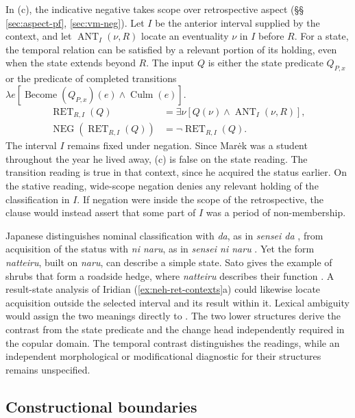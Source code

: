 In (c), the indicative negative takes scope over retrospective aspect
(§§\,\ref{sec:aspect-pf}, \ref{sec:vm-neg}). Let $I$ be the anterior
interval supplied by the context, and let $\operatorname{ANT}_{I}(\nu,R)$
locate an eventuality $\nu$ in $I$ before $R$. For a state, the
temporal relation can be satisfied by a relevant portion of its holding,
even when the state extends beyond $R$. The input $Q$ is either
the state predicate $Q_{P,x}$ or the predicate of completed transitions
$\lambda e[\operatorname{Become}(Q_{P,x})(e)\land\operatorname{Culm}(e)]$.
\[
\begin{aligned}
 \operatorname{RET}_{R,I}(Q)
   &=\exists\nu[Q(\nu)\land\operatorname{ANT}_{I}(\nu,R)],\\
 \operatorname{NEG}(\operatorname{RET}_{R,I}(Q))
   &=\neg\operatorname{RET}_{R,I}(Q).
\end{aligned}
\]
The interval $I$ remains fixed under negation. Since Marėk was a student
throughout the year he lived away, (c) is false on the state reading.
The transition reading is true in that context, since he acquired the
status earlier. On the stative reading, wide-scope negation denies any
relevant holding of the classification in $I$. If negation were
inside the scope of the retrospective, the clause would instead
assert that some part of $I$ was a period of non-membership.

Japanese distinguishes nominal classification with \textit{da},
as in \textit{sensei da} , from acquisition of
the status with \textit{ni naru}, as in \textit{sensei ni naru}
 \cite[455]{martin1988}. Yet the form
\textit{natteiru}, built on \textit{naru}, can describe a simple
state. Sato gives the example of shrubs that form a roadside hedge,
where \textit{natteiru} describes their function
\cite[§4.2, ex.~(23a)]{sato1999}. A result-state analysis of Iridian
(\ref{ex:neh-ret-contexts}a) could likewise locate acquisition outside
the selected interval and its result within it. Lexical ambiguity
would assign the two meanings directly to . The two lower
structures derive the contrast from the state predicate and the change
head independently required in the copular domain. The temporal contrast
distinguishes the readings, while an independent morphological or
modificational diagnostic for their structures remains unspecified.

\subsection{Constructional boundaries}

